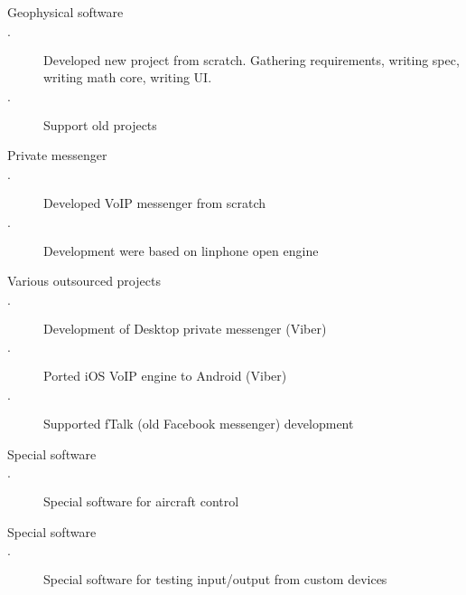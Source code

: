 \documentclass[11pt, a4paper]{moderncv}
\begin{document}

{
Geophysical software
\begin{description}
\item[$\cdot$] Developed new project from scratch. Gathering requirements, writing spec, writing math core, writing UI.
\item[$\cdot$] Support old projects
\end{description}
}

{
Private messenger
\begin{description}
\item[$\cdot$] Developed VoIP messenger from scratch 
\item[$\cdot$] Development were based on linphone open engine 
\end{description}
}

{
Various outsourced projects
\begin{description}
\item[$\cdot$] Development of Desktop private messenger (Viber)
\item[$\cdot$] Ported iOS VoIP engine to Android (Viber)
\item[$\cdot$] Supported fTalk (old Facebook messenger) development
\end{description}
}

{
Special software
\begin{description}
\item[$\cdot$] Special software for aircraft control 
\end{description}
}

{
Special software
\begin{description}
\item[$\cdot$] Special software for testing input/output from custom devices
\end{description}
}
\end{document}
